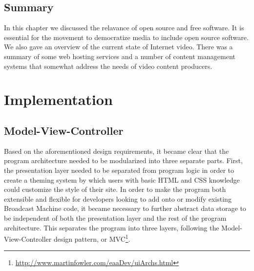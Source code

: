 \documentclass[a4paper,12pt]{report}
\begin{document}
\section{Summary}
In this chapter we discussed the relavance of open source and free software. It is essential for the movement to democratize 
media to include open source software. We also gave an overview of the current state of Internet video. There was a summary of some web 
hosting services and a number of content management systems that somewhat address the needs of video content producers. 

\chapter{Implementation}

\section{Model-View-Controller}
Based on the aforementioned design requirements, it became clear that the program architecture needed to be modularized into three separate parts. First, the presentation layer needed to be separated from program logic in order to create a theming system by which users with basic HTML and CSS knowledge could customize the style of their site. In order to make the program both extensible and flexible for developers looking to add onto or modify existing Broadcast Machine code, it became necessary to further abstract data storage to be independent of both the presentation layer and the rest of the program architecture. This separates the program into three layers, following the Model-View-Controller design pattern, or MVC\footnote{\url{http://www.martinfowler.com/eaaDev/uiArchs.html}}.
\end{document}
